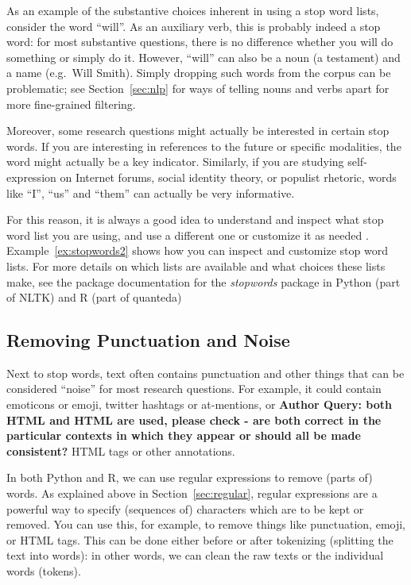 As an example of the substantive choices inherent in using a stop word lists,
consider the word ``will''.
As an auxiliary verb, this is probably indeed a stop word: for most substantive questions, there is no difference
whether you will do something or simply do it.
However, ``will'' can also be a noun (a testament) and a name (e.g.\ Will Smith).
Simply dropping such words from the corpus can be problematic; see Section~\ref{sec:nlp} for ways of telling nouns and verbs apart
for more fine-grained filtering.

Moreover, some research questions might actually be interested in certain stop words.
If you are interesting in references to the future or specific modalities,
the word might actually be a key indicator.
Similarly, if you are studying self-expression on Internet forums, social identity theory, or populist rhetoric,
words like ``I'', ``us'' and ``them'' can actually be very informative.

For this reason, it is always a good idea to understand and inspect what stop word list you are using,
and use a different one or customize it as needed \citep[see also][]{nothman18}.
Example~\ref{ex:stopwords2} shows how you can inspect and customize stop word lists.
For more details on which lists are available and what choices these lists make,
see the package documentation for the \emph{stopwords} package in Python (part of NLTK) and R (part of quanteda)




\subsection{Removing Punctuation and Noise}


Next to stop words, text often contains punctuation and other things that can be considered ``noise'' for most research questions.
For example, it could contain emoticons or emoji, twitter hashtags or at-mentions, or {\bf Author Query: both HTML and HTML are used, please check - are both correct in the particular contexts in which they appear or should all be made consistent?} HTML tags or other annotations.

In both Python and R, we can use regular expressions to remove (parts of) words.
As explained above in Section~\ref{sec:regular}, regular expressions are a powerful way to specify (sequences of) characters which are to be kept or removed.
You can use this, for example, to remove things like punctuation, emoji, or HTML tags.
This can be done either before or after tokenizing (splitting the text into words):
in other words, we can clean the raw texts or the individual words (tokens).

